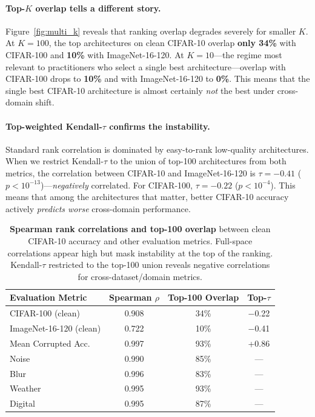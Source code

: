 \paragraph{Top-$K$ overlap tells a different story.}
Figure~\ref{fig:multi_k} reveals that ranking overlap degrades severely for smaller $K$.
At $K{=}100$, the top architectures on clean CIFAR-10 overlap \textbf{only 34\%} with CIFAR-100 and \textbf{10\%} with ImageNet-16-120.
At $K{=}10$---the regime most relevant to practitioners who select a single best architecture---overlap with CIFAR-100 drops to \textbf{10\%} and with ImageNet-16-120 to \textbf{0\%}.
This means that the single best CIFAR-10 architecture is almost certainly \emph{not} the best under cross-domain shift.

\paragraph{Top-weighted Kendall-$\tau$ confirms the instability.}
Standard rank correlation is dominated by easy-to-rank low-quality architectures.
When we restrict Kendall-$\tau$ to the union of top-100 architectures from both metrics, the correlation between CIFAR-10 and ImageNet-16-120 is $\tau = -0.41$ ($p < 10^{-13}$)---\emph{negatively} correlated.
For CIFAR-100, $\tau = -0.22$ ($p < 10^{-4}$).
This means that among the architectures that matter, better CIFAR-10 accuracy actively \emph{predicts worse} cross-domain performance.

\begin{table}[t]
\centering
\caption{\textbf{Spearman rank correlations and top-100 overlap} between clean CIFAR-10 accuracy and other evaluation metrics. Full-space correlations appear high but mask instability at the top of the ranking. Kendall-$\tau$ restricted to the top-100 union reveals negative correlations for cross-dataset/domain metrics.}
\label{tab:correlations}
\small
\begin{tabular}{@{}lccc@{}}
\toprule
Evaluation Metric & Spearman $\rho$ & Top-100 Overlap & Top-$\tau$ \\
\midrule
CIFAR-100 (clean)       & 0.908 & 34\% & $-$0.22 \\
ImageNet-16-120 (clean) & 0.722 & 10\% & $-$0.41 \\
Mean Corrupted Acc.     & 0.997 & 93\% & +0.86 \\
\quad Noise             & 0.990 & 85\% & --- \\
\quad Blur              & 0.996 & 83\% & --- \\
\quad Weather           & 0.995 & 93\% & --- \\
\quad Digital           & 0.995 & 87\% & --- \\
\bottomrule
\end{tabular}
\end{table}

